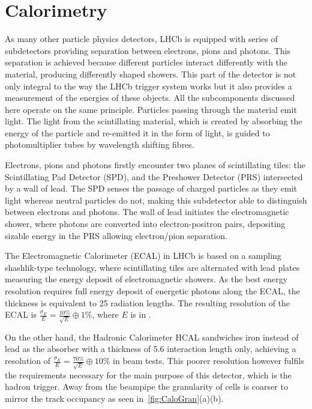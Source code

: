 \section{Calorimetry }
\label{calosys}
As many other particle physics detectors, \Gls{LHCb} is equipped with series of subdetectors providing separation between electrons, pions and photons. This separation is achieved because different particles interact differently with the material, producing differently shaped showers. This part of the detector is not only integral to the way the \Gls{LHCb} trigger system works but it also provides a measurement of the energies of these objects.
All the subcomponents discussed here operate on the same principle. Particles passing through the material emit light. The light from the scintillating material, which is created by absorbing the energy of the particle and re-emitted it in the form of light, is guided to photomultiplier tubes by wavelength shifting fibres.

Electrons, pions and photons firstly encounter two planes of scintillating tiles: the Scintillating Pad Detector (\Gls{SPD}), and the Preshower Detector (\Gls{PRS}) intersected by a wall of lead. The \Gls{SPD} senses the passage of charged particles as they emit light whereas neutral particles do not, making this subdetector able to distinguish between electrons and photons. The wall of lead initiates the electromagnetic shower, where photons are converted into electron-positron pairs, depositing sizable energy in the \Gls{PRS} allowing electron/pion separation. 

The Electromagnetic Calorimeter (\Gls{ECAL}) in \gls{LHCb} is based on a sampling shashlik-type technology, where scintillating tiles are alternated with lead plates measuring the energy deposit of electromagnetic showers. As the best energy resolution requires full energy deposit of energetic photons along the \Gls{ECAL}, the thickness is equivalent to 25 radiation lengths. The resulting resolution of the \Gls{ECAL} is $\frac{\sigma_{E}}{E} = \frac{10\%}{\sqrt{E}} \oplus 1\%$, where $E$ is in \gev.

On the other hand, the Hadronic Calorimeter \Gls{HCAL} sandwiches iron instead of lead as the absorber with a thickness of 5.6 interaction length only, achieving a resolution of $\frac{\sigma_{E}}{E} = \frac{70\%}{\sqrt{E}} \oplus 10\%$ in beam tests. This poorer resolution however fulfils the requirements necessary for the main purpose of this detector, which is the hadron trigger. Away from the beampipe the granularity of cells is coarser to mirror the track occupancy as seen in~\autoref{fig:CaloGran}(a)(b). 

